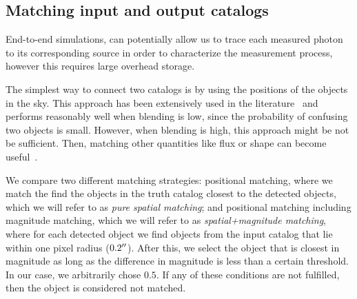 \documentclass[twocolumn]{aastex62}
\begin{document}
\subsection{Matching input and output catalogs}
\label{sec:matching}

End-to-end simulations, can potentially allow us to trace each measured photon to its corresponding source in order to characterize the measurement process, however this requires large overhead storage. 


The simplest way to connect two catalogs is by using the positions of the objects in the sky. This approach has been extensively used in the literature~\citep{1977A&AS...28..211D,1983Obs...103..150B,1986MNRAS.223..279W} and performs reasonably well when blending is low, since the probability of confusing two objects is small. However, when blending is high, this approach might be not be sufficient. Then, matching other quantities like flux or shape can become useful~\citep{2008ApJ...679..301B}.

We compare two different matching strategies: positional matching, where we match the find the objects in the truth catalog closest to the detected objects, which we will refer to as \textit{pure spatial matching}; and positional matching including magnitude matching, which we will refer to as \textit{spatial+magnitude matching}, where for each detected object we find objects from the input catalog that lie within one pixel radius ($0.2 \mbox{$^{\prime\prime}$}$). After this, we select the object that is closest in magnitude as long as the difference in magnitude is less than a certain threshold. In our case, we arbitrarily chose $0.5$. If any of these conditions are not fulfilled, then the object is considered not matched.
\end{document}
